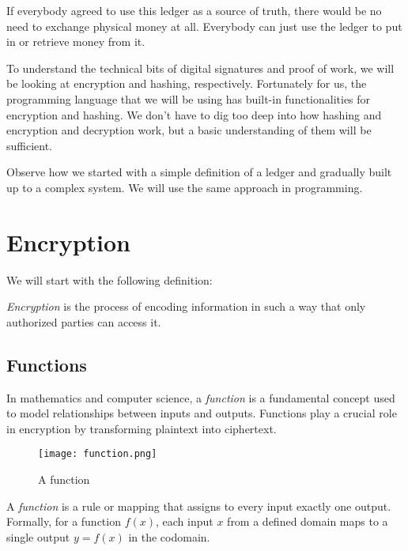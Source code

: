 \documentclass[12pt,a4paper]{report}
\begin{document}
\vspace{0.5em}

If everybody agreed to use this ledger as a source of truth, there would 
be no need to exchange physical money at all. Everybody can just use the 
ledger to put in or retrieve money from it.

To understand the technical bits of digital signatures and proof 
of work, we will be looking at encryption and hashing, respectively. 
Fortunately for us, the programming language that we will be using has 
built-in functionalities for encryption and hashing. We don’t have to dig 
too deep into how hashing and encryption and decryption work, but a 
basic understanding of them will be sufficient.

Observe how we started with a simple definition of a ledger and 
gradually built up to a complex system. We will use the same approach in 
programming.


\section{Encryption}

We will start with the following definition:

\begin{tcolorbox}[colframe=black!75, colback=white, sharp corners, fonttitle=\bfseries, boxrule=0.5pt, title=\faInfoCircle\ Definition 1-6]
\textit{Encryption} is the process of encoding information in such a way that only authorized parties can access it.
\end{tcolorbox}

\subsection{Functions}

In mathematics and computer science, a \textit{function} is a fundamental concept used to model relationships between inputs and outputs. Functions play a crucial role in encryption by transforming plaintext into ciphertext.

\begin{figure}[H]
    \centering
    \texttt{[image: function.png]}
    \caption{A function}
    \label{fig:function}
\end{figure}


\begin{tcolorbox}[colframe=black!75, colback=white, sharp corners, fonttitle=\bfseries, boxrule=0.5pt, title=\faInfoCircle\ Definition 1-6]
A \textit{function} is a rule or mapping that assigns to every input exactly one output. Formally, for a function \(f(x)\), each input \(x\) from a defined domain maps to a single output \(y = f(x)\) in the codomain.
\end{tcolorbox}
\end{document}

